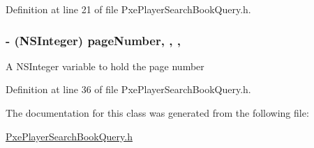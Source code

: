Definition at line 21 of file Pxe\-Player\-Search\-Book\-Query.\-h.

\hypertarget{interface_pxe_player_search_book_query_ade43017f3723042bd108214528a50569}{
\subsubsection[{page\-Number}]{\setlength{\rightskip}{0pt plus 5cm}-\/ (N\-S\-Integer) page\-Number\hspace{0.3cm}{\ttfamily [read]}, {\ttfamily [write]}, {\ttfamily [nonatomic]}, {\ttfamily [assign]}}}\label{interface_pxe_player_search_book_query_ade43017f3723042bd108214528a50569}
A N\-S\-Integer variable to hold the page number 

Definition at line 36 of file Pxe\-Player\-Search\-Book\-Query.\-h.



The documentation for this class was generated from the following file\-:\begin{DoxyCompactItemize}
\item 
\hyperlink{_pxe_player_search_book_query_8h}{Pxe\-Player\-Search\-Book\-Query.\-h}\end{DoxyCompactItemize}

